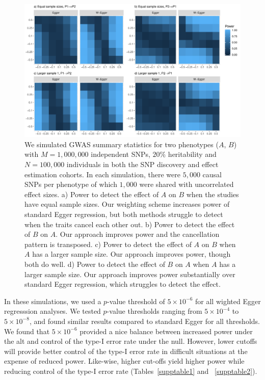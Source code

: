 \documentclass{article}
\begin{document}
\begin{figure}\label{figure2}
\includegraphics[width=\textwidth]{figures/figure2.pdf}
\caption{We simulated GWAS summary statistics for two phenotypes ($A$, $B$) with $M=1,000,000$
independent SNPs, $20\%$ heritability and $N = 100,000$ individuals in both
 the SNP discovery and effect estimation cohorts. In each simulation, there
 were $5,000$ causal SNPs per phenotype of which $1,000$ were shared with uncorrelated
 effect sizes. a) Power to detect the effect of $A$ on $B$ when the studies have equal
 sample sizes. Our weighting scheme increases power of standard Egger regression, but both
 methods struggle to detect when the traits cancel each other out. b) Power to detect the
 effect of $B$ on $A$. Our approach improves power and the cancellation pattern is transposed.
 c) Power to detect the effect of $A$ on $B$ when $A$ has a larger sample size. Our approach
 improves power, though both do well. d) Power to detect the effect of $B$ on $A$ when
  $A$ has a larger sample size. Our approach improves power substantially over standard
  Egger regression, which struggles to detect the effect.}
\end{figure}

In these simulations, we used a $p$-value threshold of $5\times 10^{-6}$
for all wighted Egger regresssion analyses. We tested $p$-value thresholds
ranging from $5\times 10^{-4}$ to $5\times 10^{-8}$, and found similar
results compared to standard Egger for all thresholds. We found that
$5\times 10^{-6}$ provided a nice balance between increased power under 
the alt and control of the type-I error rate under the null. However, lower
cutoffs will provide better control of the type-I error rate in difficult situations
at the expense of reduced power. Like-wise, higher cut-offs yield higher power
while reducing control of the type-I error rate
(Tables~\ref{supptable1} and ~\ref{supptable2}). 
\end{document}
